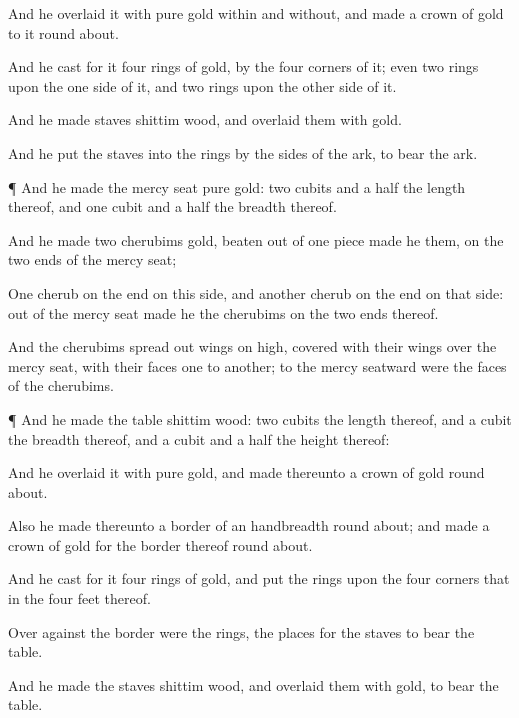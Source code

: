 {And he
overlaid it with
pure
gold
within and
without, and
made a
crown of
gold to it round
about.

And he
cast for it
four
rings of
gold,
{} by the
four
corners of it; even
two
rings upon the
one
side of it, and
two
rings upon the
other
side of it.

And he
made
staves
{}
shittim
wood, and
overlaid them with
gold.

And he
put the
staves into the
rings by the
sides of the
ark, to
bear the
ark.


\par }{\PP {}¶ And he
made the mercy
seat
{}
pure
gold: two
cubits and a
half
{} the
length thereof, and one
cubit and a
half the
breadth thereof.

And he
made
two
cherubims
{}
gold, beaten out of one
piece
made he them, on the
two
ends of the mercy
seat;

One
cherub on the
end on this side, and
another
cherub on the
{}
end on that side: out of the mercy
seat
made he the
cherubims on the
two
ends thereof.

And the
cherubims spread
out
{}
wings on
high,
{}
covered with their
wings over the mercy
seat, with their
faces
one to
another;
{} to the mercy
seatward were the
faces of the
cherubims.


\par }{\PP {}¶ And he
made the
table
{}
shittim
wood: two
cubits
{} the
length thereof, and a
cubit the
breadth thereof, and a
cubit and a
half the
height thereof:

And he
overlaid it with
pure
gold, and
made thereunto a
crown of
gold round
about.

Also he
made thereunto a
border of an
handbreadth round
about; and
made a
crown of
gold for the
border thereof round
about.

And he
cast for it
four
rings of
gold, and
put the
rings upon the
four
corners that
{} in the
four
feet thereof.

Over
against the
border were the
rings, the
places for the
staves to
bear the
table.

And he
made the
staves
{}
shittim
wood, and
overlaid them with
gold, to
bear the
table.

}
